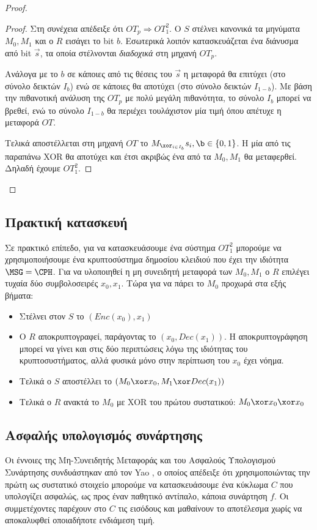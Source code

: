 \begin{proof}
\begin{proof}
Στη συνέχεια απέδειξε ότι $OT_p \Rightarrow OT_1^2$. Ο $S$ στέλνει κανονικά τα μηνύματα $M_0, M_1$ και ο $R$ εισάγει το bit $b$.
Εσωτερικά λοιπόν κατασκευάζεται ένα διάνυσμα από bit $\vec{s}$, τα οποία στέλνονται \emph{διαδοχικά} στη μηχανή $OT_p$. 

Ανάλογα με το $b$ σε κάποιες από τις θέσεις του $\vec{s}$ η μεταφορά θα επιτύχει (στο σύνολο δεικτών $I_b$) ενώ σε κάποιες θα αποτύχει (στο σύνολο δεικτών $I_{1-b}$). Με βάση την πιθανοτική ανάλυση της $OT_p$ με πολύ μεγάλη πιθανότητα, το σύνολο $I_b$ μπορεί να βρεθεί, ενώ το σύνολο $I_{1-b}$ θα περιέχει τουλάχιστον μία τιμή όπου απέτυχε η μεταφορά $OT$.

Τελικά αποστέλλεται στη μηχανή $OT$ το $M_{\xor_{i \in I_b}} s_i, \b \in \{0,1\}$. H μία από τις παραπάνω XOR θα αποτύχει και έτσι ακριβώς ένα από τα $M_0, M_1$ θα μεταφερθεί. Δηλαδή έχουμε $OT_1^2$.
\end{proof}

\end{proof}

\subsection{Πρακτική κατασκευή}
Σε πρακτικό επίπεδο, για να κατασκευάσουμε ένα σύστημα $OT_1^2$ μπορούμε να χρησιμοποιήσουμε ένα κρυπτοσύστημα δημοσίου κλειδιού που έχει την ιδιότητα $\MSG = \CPH$. Για να υλοποιηθεί η μη συνειδητή μεταφορά των $M_0, M_1$ ο $R$ επιλέγει τυχαία δύο συμβολοσειρές $x_0, x_1$.
Τώρα για να πάρει το $M_0$ προχωρά στα εξής βήματα:
\begin{itemize}
\item Στέλνει στον $S$ το $(Enc(x_0),x_1)$
\item Ο $R$ αποκρυπτογραφεί, παράγοντας το $(x_0, Dec(x_1))$. Η αποκρυπτογράφηση μπορεί να γίνει και στις δύο περιπτώσεις λόγω της ιδιότητας του κρυπτοσυστήματος, αλλά φυσικά μόνο στην περίπτωση του $x_0$ έχει νόημα.
\item Τελικά ο $S$ αποστέλλει το $(M_0 \xor x_0, M_1 \xor Dec(x_1))$
\item Τελικά ο $R$ ανακτά το $M_0$ με XOR του πρώτου συστατικού: $M_0 \xor x_0 \xor x_0$
\end{itemize}
 
\subsection{Ασφαλής υπολογισμός συνάρτησης}
\label{sec:YAOSFE}
Οι έννοιες της Μη-Συνειδητής Μεταφοράς και του Ασφαλούς Υπολογισμού Συνάρτησης συνδυάστηκαν από τον Yao \cite{yao_how_1986}, ο οποίος απέδειξε ότι χρησιμοποιώντας την πρώτη ως συστατικό στοιχείο μπορούμε να κατασκευάσουμε ένα κύκλωμα $C$ που υπολογίζει ασφαλώς, ως προς έναν παθητικό αντίπαλο, κάποια συνάρτηση $f$. Οι συμμετέχοντες παρέχουν στο $C$ τις εισόδους και μαθαίνουν το αποτέλεσμα χωρίς να αποκαλυφθεί οποιαδήποτε ενδιάμεση τιμή. 

